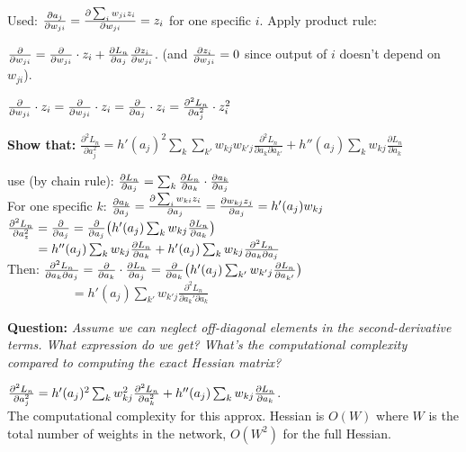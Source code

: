 \tab Used: $\pdv{a_j}{w_{ji}}=\pdv{\sum_i w_{ji}z_i}{w_{ji}}=z_i$ for one specific $i$. Apply product rule:

\tab$\pdv{}{w_{ji}} (\pdv{L_n}{a_j}\cdot z_i)=\pdv{}{w_{ji}} (\pdv{L_n}{a_j})\cdot z_i+\pdv{L_n}{a_j}\pdv{z_i}{w_{ji}}$. (and $\pdv{z_i}{w_{ji}}=0$ since output of $i$ doesn't depend on $w_{ji}$).

\tab $\pdv{}{w_{ji}} ( \pdv{L_n}{a_j} )\cdot z_i=\pdv{}{w_{ji}} (\pdv{L_n}{w_{ji}})\cdot z_i=\pdv{}{a_j} (\pdv{L_n}{a_j}\pdv{a_j}{w_{ji}})\cdot z_i=\pdv[2]{L_n}{a_j}\cdot z_i^2$

\textbf{Show that:} $\frac{\partial^2 L_n}{\partial a_j^2}=h'(a_j)^2\sum\limits_k\sum\limits_{k'} w_{kj}w_{k'j}\frac{\partial^2 L_n}{\partial a_k \partial a_{k'}}+h''(a_j)\sum\limits_k w_{kj}\frac{\partial L_n}{\partial a_k}$

\tab use (by chain rule): $\pdv{L_n}{a_j} = \sum_k \pdv{L_n}{a_k} \cdot \pdv{a_k}{a_j}$\\
\tab For one specific $k$: $\pdv{a_k}{a_j} = \pdv{\sum_i w_{ki} z_i}{a_j} = \pdv{w_{kj} z_j}{a_j} = h'(a_j) w_{kj}$\\

\tab$\pdv[2]{L_n}{a_z} = \pdv{}{a_j} ( \pdv{L_n}{a_j} ) = \pdv{}{a_j} \bigr( h'(a_j) \sum_k w_{kj} \pdv{L_n}{a_k} \bigr) $\\
\tab$\phantom{\pdv[2]{L_n}{a_z} } = h''(a_j) \sum_k w_{kj} \pdv{L_n}{a_k}+h'(a_j) \sum_k w_{kj} \frac{\partial^2 L_n}{\partial a_k \partial a_j}$\\

Then: $\frac{\partial^2 L_n}{\partial a_k \partial a_j}= \pdv{}{a_k} \cdot \pdv{L_n}{a_j} = \pdv{}{a_k} \bigr(h'(a_j) \sum_{k'} w_{k'j} \pdv{L_n}{a_{k'}} \bigr)$\\

$\phantom{\text{Then: }\frac{\partial^2 L_n}{\partial a_k \partial a_j}}=h'(a_j)\sum_{k'} w_{k'j} \frac{\partial^2 L_n}{\partial a_k' \partial a_k}$

\textbf{Question:} \emph{Assume we can neglect off-diagonal elements in the second-derivative terms. What expression do we get? What's the computational complexity compared to computing the exact Hessian matrix?}

\tab$\pdv[2]{L_n}{a_j} = h'(a_j)^2 \sum_k w^2_{kj} \pdv[2]{L_n}{a_k} + h''(a_j) \sum_k w_{kj} \pdv{L_n}{a_k}$.\\

\tab The computational complexity for this approx. Hessian is $O(W)$ where $W$ is the total number of weights in the network, $O(W^2)$ for the full Hessian.

        

        



